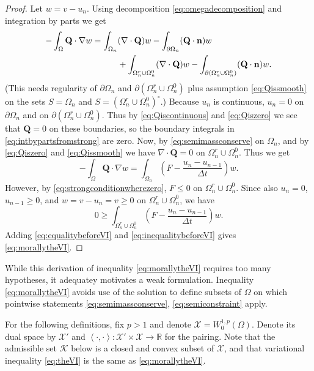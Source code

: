 \documentclass[final,onefignum]{siamart190516}
\newcommand\bn{\mathbf{n}}
\newcommand\bQ{\mathbf{Q}}
\newcommand{\Div}{\nabla\cdot}
\newcommand{\grad}{\nabla}
\newcommand{\ip}[2]{\ensuremath{\left<#1,#2\right>}}
\newcommand\RR{\mathbb{R}}
\begin{document}
\begin{proof}  Let $w=v-u_n$.  Using decomposition \eqref{eq:omegadecomposition} and integration by parts we get
\begin{align}
-\int_{\Omega} \bQ \cdot \grad w &= \int_{\Omega_n} (\Div \bQ) w - \int_{\partial \Omega_n} (\bQ \cdot \bn) w \label{eq:intbypartsfromstrong} \\
  &\qquad\quad + \int_{\Omega_n^r \cup \Omega_n^0} (\Div \bQ) w - \int_{\partial(\Omega_n^r \cup \Omega_n^0)} (\bQ \cdot \bn) w. \notag
\end{align}
(This needs regularity of $\partial \Omega_n$ and $\partial(\Omega_n^r \cup \Omega_n^0)$ plus assumption \eqref{eq:Qissmooth} on the sets $S=\Omega_n$ and $S=(\Omega_n^r \cup \Omega_n^0)^\circ$.)  Because $u_n$ is continuous, $u_n=0$ on $\partial \Omega_n$ and on $\partial(\Omega_n^r \cup \Omega_n^0)$.  Thus by \eqref{eq:Qiscontinuous} and \eqref{eq:Qiszero} we see that $\bQ=0$ on these boundaries, so the boundary integrals in \eqref{eq:intbypartsfromstrong} are zero.  Now, by \eqref{eq:semimassconserve} on $\Omega_n$, and by \eqref{eq:Qiszero} and \eqref{eq:Qissmooth} we have $\Div \bQ=0$ on $\Omega_n^r \cup \Omega_n^0$.  Thus we get
\begin{equation}
-\int_{\Omega} \bQ \cdot \grad w = \int_{\Omega_n} \left(F - \frac{u_n - u_{n-1}}{\Delta t}\right) w. \label{eq:equalitybeforeVI}
\end{equation}
However, by \eqref{eq:strongconditionwherezero}, $F \le 0$ on $\Omega_n^r \cup \Omega_n^0$.  Since also $u_n=0$, $u_{n-1}\ge 0$, and $w = v-u_n = v \ge 0$ on $\Omega_n^r \cup \Omega_n^0$, we have
\begin{equation}
    0 \ge \int_{\Omega_n^r \cup \Omega_n^0} \left(F - \frac{u_n - u_{n-1}}{\Delta t}\right) w. \label{eq:inequalitybeforeVI}
\end{equation}
Adding \eqref{eq:equalitybeforeVI} and \eqref{eq:inequalitybeforeVI} gives \eqref{eq:morallytheVI}.
\end{proof}

While this derivation of inequality \eqref{eq:morallytheVI} requires too many hypotheses, it adequatey motivates a weak formulation.  Inequality \eqref{eq:morallytheVI} avoids use of the solution to define subsets of $\Omega$ on which pointwise statements \eqref{eq:semimassconserve}, \eqref{eq:semiconstraint} apply.

For the following definitions, fix $p>1$ and denote $\mathcal{X} = W_0^{1,p}(\Omega)$.  Denote its dual space by $\mathcal{X}'$ and $\ip{\cdot}{\cdot}: \mathcal{X}' \times \mathcal{X} \to \RR$ for the pairing.  Note that the admissible set $\mathcal{K}$ below is a closed and convex subset of $\mathcal{X}$, and that variational inequality \eqref{eq:theVI} is the same as \eqref{eq:morallytheVI}.
\end{document}
